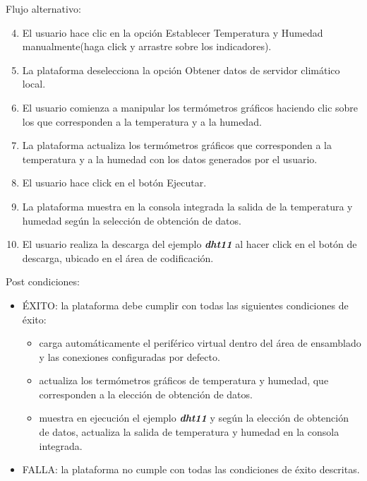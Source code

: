 Flujo alternativo:
\begin{enumerate}
    \setcounter{enumi}{3}
	\item El usuario hace clic en la opción \textquotedbl Establecer Temperatura y Humedad manualmente(haga click y arrastre sobre
los indicadores).\textquotedbl
	\item La plataforma deselecciona la opción \textquotedbl Obtener datos de servidor climático local.\textquotedbl
    \item El usuario comienza a manipular los termómetros gráficos haciendo clic sobre los que corresponden a la temperatura y a la humedad.
    \item La plataforma actualiza los termómetros gráficos que corresponden a la temperatura y a la humedad con los datos generados por el usuario.

	\item El usuario hace click en el botón \textquotedbl Ejecutar\textquotedbl.
	
	\item La plataforma muestra en la consola integrada la salida de la temperatura y humedad según la selección de obtención de datos.
	
	\item El usuario realiza la descarga del ejemplo \textit{\textbf{dht11}} al hacer click en el botón de descarga, ubicado en el área de codificación.
\end{enumerate}



Post condiciones:
\begin{itemize}
	\item ÉXITO: la plataforma debe cumplir con todas las siguientes condiciones de éxito:
	
		\begin{itemize}
	    \item  carga automáticamente el periférico virtual dentro del área de ensamblado y las conexiones configuradas por defecto.
	    
	    \item actualiza los termómetros gráficos de  temperatura y  humedad, que  corresponden a la elección de obtención de datos.

	    \item muestra en ejecución el ejemplo \textit{\textbf{dht11}} y según la elección de obtención de datos, actualiza la salida de temperatura y humedad en la consola integrada.
	    \end{itemize}
	
	\item FALLA: la plataforma no cumple con todas las condiciones de éxito descritas.
\end{itemize}

